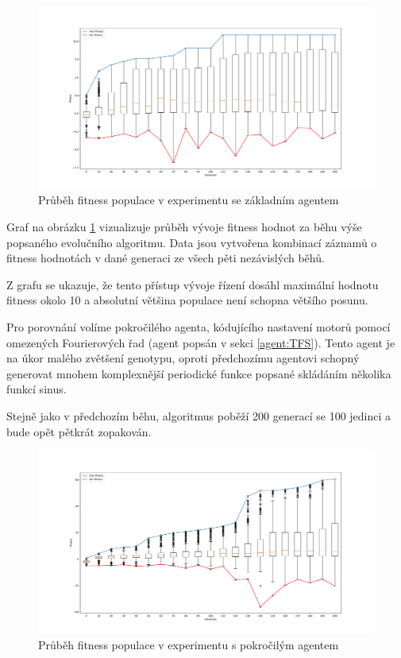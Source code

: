 \begin{figure}[!h]
    \centering
    \includegraphics[width=1\textwidth]{../img/experiment1_Sine_10ticks.pdf}
    \caption{Průběh fitness populace v experimentu se základním agentem}
    \label{exp:first_sinefull}
\end{figure}

Graf na obrázku \ref{exp:first_sinefull} vizualizuje průběh vývoje fitness
hodnot za běhu výše popsaného evolučního algoritmu. Data jsou vytvořena
kombinací záznamů o fitness hodnotách v dané generaci ze všech pěti nezávislých
běhů.

Z grafu se ukazuje, že tento přístup vývoje řízení dosáhl maximální hodnotu
fitness okolo 10 a absolutní většina populace není schopna většího posunu. 

Pro porovnání volíme pokročilého agenta, kódujícího nastavení motorů pomocí
omezených Fourierových řad (agent popsán v sekci \ref{agent:TFS}). Tento agent
je na úkor malého zvětšení genotypu, oproti předchozímu agentovi schopný
generovat mnohem komplexnější periodické funkce popsané skládáním několika
funkcí sinus.

Stejně jako v předchozím běhu, algoritmus poběží 200 generací se 100 jedinci a
bude opět pětkrát zopakován.

\begin{figure}[!h]
    \centering
    \includegraphics[width=1\textwidth]{../img/experiment1_TFS_10ticks.pdf}
    \caption{Průběh fitness populace v experimentu s pokročilým agentem}
    \label{exp:first_TFS}
\end{figure}


